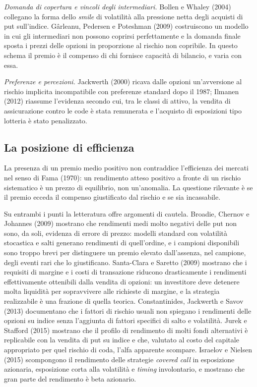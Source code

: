 \documentclass[11pt,a4paper]{article}
\begin{document}
\emph{Domanda di copertura e vincoli degli intermediari.} Bollen e Whaley (2004) collegano la forma dello \emph{smile} di volatilità alla pressione netta degli acquisti di put sull'indice. Gârleanu, Pedersen e Poteshman (2009) costruiscono un modello in cui gli intermediari non possono coprirsi perfettamente e la domanda finale sposta i prezzi delle opzioni in proporzione al rischio non copribile. In questo schema il premio è il compenso di chi fornisce capacità di bilancio, e varia con essa.

\emph{Preferenze e percezioni.} Jackwerth (2000) ricava dalle opzioni un'avversione al rischio implicita incompatibile con preferenze standard dopo il 1987; Ilmanen (2012) riassume l'evidenza secondo cui, tra le classi di attivo, la vendita di assicurazione contro le code è stata remunerata e l'acquisto di esposizioni tipo lotteria è stato penalizzato.

\subsection{La posizione di efficienza}

La presenza di un premio medio positivo non contraddice l'efficienza dei mercati nel senso di Fama (1970): un rendimento atteso positivo a fronte di un rischio sistematico è un prezzo di equilibrio, non un'anomalia. La questione rilevante è se il premio ecceda il compenso giustificato dal rischio e se sia incassabile.

Su entrambi i punti la letteratura offre argomenti di cautela. Broadie, Chernov e Johannes (2009) mostrano che rendimenti medi molto negativi delle put non sono, da soli, evidenza di errore di prezzo: modelli standard con volatilità stocastica e salti generano rendimenti di quell'ordine, e i campioni disponibili sono troppo brevi per distinguere un premio elevato dall'assenza, nel campione, degli eventi rari che lo giustificano. Santa-Clara e Saretto (2009) mostrano che i requisiti di margine e i costi di transazione riducono drasticamente i rendimenti effettivamente ottenibili dalla vendita di opzioni: un investitore deve detenere molta liquidità per sopravvivere alle richieste di margine, e la strategia realizzabile è una frazione di quella teorica. Constantinides, Jackwerth e Savov (2013) documentano che i fattori di rischio usuali non spiegano i rendimenti delle opzioni su indice senza l'aggiunta di fattori specifici di salto e volatilità. Jurek e Stafford (2015) mostrano che il profilo di rendimento di molti fondi alternativi è replicabile con la vendita di put su indice e che, valutato al costo del capitale appropriato per quel rischio di coda, l'alfa apparente scompare. Israelov e Nielsen (2015) scompongono il rendimento delle strategie \emph{covered call} in esposizione azionaria, esposizione corta alla volatilità e \emph{timing} involontario, e mostrano che gran parte del rendimento è beta azionario.
\end{document}
